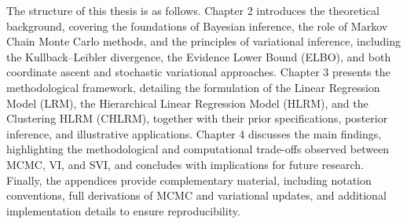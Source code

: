 \medskip

The structure of this thesis is as follows. Chapter 2 introduces the theoretical background, covering the foundations of Bayesian inference, the role of Markov Chain Monte Carlo methods, and the principles of variational inference, including the Kullback–Leibler divergence, the Evidence Lower Bound (ELBO), and both coordinate ascent and stochastic variational approaches. Chapter 3 presents the methodological framework, detailing the formulation of the Linear Regression Model (LRM), the Hierarchical Linear Regression Model (HLRM), and the Clustering HLRM (CHLRM), together with their prior specifications, posterior inference, and illustrative applications. Chapter 4 discusses the main findings, highlighting the methodological and computational trade-offs observed between MCMC, VI, and SVI, and concludes with implications for future research. Finally, the appendices provide complementary material, including notation conventions, full derivations of MCMC and variational updates, and additional implementation details to ensure reproducibility.
